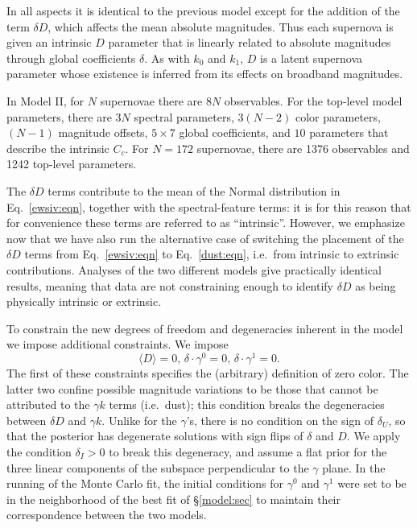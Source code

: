 \documentclass{aastex61}   	%
\begin{document}
In all aspects it is identical to the previous model except for the addition of the term $\delta D$,
which affects the mean
absolute magnitudes.  Thus
each supernova is given an intrinsic $D$ parameter that is linearly related to
absolute magnitudes through global coefficients $\delta$.  As with $k_0$ and $k_1$,  $D$ is a latent supernova parameter whose existence is inferred from
its effects on broadband magnitudes.


In Model II, for $N$ supernovae there are $8N$ observables.  For the top-level model parameters, there are $3N$ spectral parameters, $3(N-2)$
color parameters, $(N-1)$ magnitude offsets,  $5 \times 7$ global coefficients, and $10$ parameters that describe the intrinsic
$C_c$.  For $N=172$ supernovae, there are 1376 observables and 1242 top-level parameters.


The $\delta D$ terms contribute to the mean of the Normal distribution in Eq.~\ref{ewsiv:eqn}, together with the spectral-feature terms:
it is for this reason that for convenience these terms are referred to as ``intrinsic''.
However, we emphasize now that we have also run the alternative case  of switching the placement of the
$\delta D$ terms from Eq.~\ref{ewsiv:eqn} to Eq.~\ref{dust:eqn}, i.e.\ from intrinsic to extrinsic contributions.
Analyses of the two different models give practically identical results, meaning that data are not constraining enough
to identify $\delta D$ as being physically intrinsic or extrinsic.


To constrain the new degrees of freedom and degeneracies inherent in the model we impose additional constraints. We impose
\begin{equation}
\langle D\rangle=0,\,  \delta \cdot \gamma^0=0,\, \delta \cdot \gamma^1=0.
\end{equation}
The first of these constraints specifies the (arbitrary) definition of zero color.   The latter two confine possible magnitude
variations to be those that cannot be attributed to 
the $\gamma k$ terms (i.e.\ dust); this condition breaks the degeneracies between $\delta D$  
and $\gamma k$. 
Unlike for the $\gamma$'s, there is no condition on the sign of $\delta_U$,
so that the posterior has degenerate solutions with sign flips of $\delta$ and $D$.
We apply the condition $\delta_I>0$ to break this degeneracy,
and assume a flat prior for the three linear components of the subspace perpendicular to the $\gamma$ plane.
In the running of the Monte Carlo fit, the initial conditions for
$\gamma^0$ and $\gamma^1$ were set to be in the neighborhood of the best fit of \S\ref{model:sec}
to maintain their correspondence between the two models. 
\end{document}
